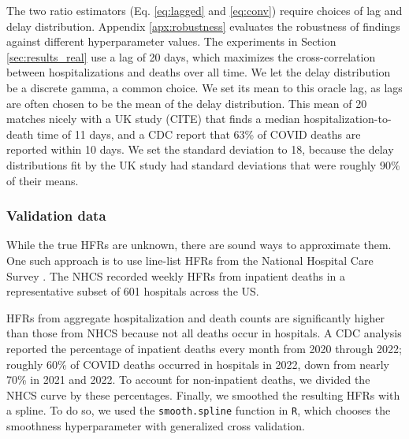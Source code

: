 \documentclass{article}
\newcommand{\ahcomment}[1]{{\color{red}[AH: #1]}}
\begin{document}
The two ratio estimators (Eq. \ref{eq:lagged} and \ref{eq:conv}) require choices of lag and delay distribution. Appendix \ref{apx:robustness} evaluates the robustness of findings against different hyperparameter values. The experiments in Section \ref{sec:results_real} use a lag of 20 days, which maximizes the cross-correlation between hospitalizations and deaths over all time. We let the delay distribution be a discrete gamma, a common choice. We set its mean to this oracle lag, as lags are often chosen to be the mean of the delay distribution. This mean of 20 matches nicely with a UK study (CITE) that finds a median hospitalization-to-death time of 11 days, and a CDC report that 63\% of COVID deaths are reported within 10 days. We set the standard deviation to 18, because the delay distributions fit by the UK study had standard deviations that were roughly 90\% of their means. 



\subsubsection{Validation data}
While the true HFRs are unknown, there are sound ways to approximate them. One such approach is to use line-list HFRs from the National Hospital Care Survey \citep{NHCS2023}. The NHCS recorded weekly HFRs from inpatient deaths in a representative subset of 601 hospitals across the US. %

HFRs from aggregate hospitalization and death counts are significantly higher than those from NHCS because not all deaths occur in hospitals. A CDC analysis reported the percentage of inpatient deaths every month from 2020 through 2022; roughly 60\% of COVID deaths occurred in hospitals in 2022, down from nearly 70\% in 2021 and 2022. To account for non-inpatient deaths, we divided the NHCS curve by these percentages. Finally, we smoothed the resulting HFRs with a spline. To do so, we used the \texttt{smooth.spline} function in \texttt{R}, which chooses the smoothness hyperparameter with generalized cross validation. %
\end{document}
